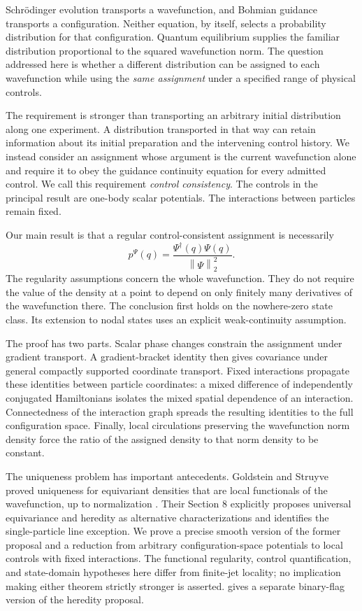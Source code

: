 \documentclass[11pt]{article}
\numberwithin{equation}{section}
\theoremstyle{definition}
\newcommand{\norm}[1]{\left\|#1\right\|}
\begin{document}
Schr\"odinger evolution transports a wavefunction, and Bohmian guidance transports a configuration. Neither equation, by itself, selects a probability distribution for that configuration. Quantum equilibrium supplies the familiar distribution proportional to the squared wavefunction norm. The question addressed here is whether a different distribution can be assigned to each wavefunction while using the \emph{same assignment} under a specified range of physical controls.

The requirement is stronger than transporting an arbitrary initial distribution along one experiment. A distribution transported in that way can retain information about its initial preparation and the intervening control history. We instead consider an assignment whose argument is the current wavefunction alone and require it to obey the guidance continuity equation for every admitted control. We call this requirement \emph{control consistency}. The controls in the principal result are one-body scalar potentials. The interactions between particles remain fixed.

Our main result is that a regular control-consistent assignment is necessarily
\begin{equation}\label{eq:born}
 p^\Psi(q)=\frac{\Psi^\dagger(q)\Psi(q)}{\norm{\Psi}_2^2}.
\end{equation}
The regularity assumptions concern the whole wavefunction. They do not require the value of the density at a point to depend on only finitely many derivatives of the wavefunction there. The conclusion first holds on the nowhere-zero state class. Its extension to nodal states uses an explicit weak-continuity assumption.

The proof has two parts. Scalar phase changes constrain the assignment under gradient transport. A gradient-bracket identity then gives covariance under general compactly supported coordinate transport. Fixed interactions propagate these identities between particle coordinates: a mixed difference of independently conjugated Hamiltonians isolates the mixed spatial dependence of an interaction. Connectedness of the interaction graph spreads the resulting identities to the full configuration space. Finally, local circulations preserving the wavefunction norm density force the ratio of the assigned density to that norm density to be constant.

The uniqueness problem has important antecedents. Goldstein and Struyve proved uniqueness for equivariant densities that are local functionals of the wavefunction, up to normalization \cite[Section 4]{GS2007}. Their Section 8 explicitly proposes universal equivariance and heredity as alternative characterizations and identifies the single-particle line exception. We prove a precise smooth version of the former proposal and a reduction from arbitrary configuration-space potentials to local controls with fixed interactions. The functional regularity, control quantification, and state-domain hypotheses here differ from finite-jet locality; no implication making either theorem strictly stronger is asserted.  gives a separate binary-flag version of the heredity proposal.
\end{document}
